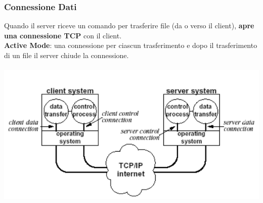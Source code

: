 \documentclass[10pt]{article}
\begin{document}
\subsubsection{Connessione Dati}
Quando il server riceve un comando per trasferire file (da o verso il client), \textbf{apre una connessione TCP} con il client.\\ \textbf{Active Mode}: una connessione per ciascun trasferimento e dopo il trasferimento di un file il server chiude la connessione.\\\\
\includegraphics[scale=0.75]{modelloftp.png}
\pagebreak
\end{document}

